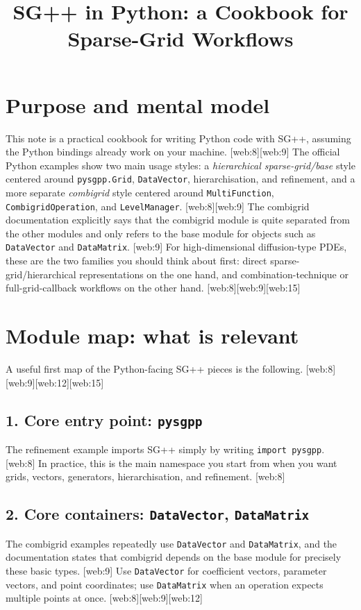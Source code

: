 \documentclass[11pt,a4paper]{article}
\title{SG++ in Python: a Cookbook for Sparse-Grid Workflows}
\author{}
\date{}
\begin{document}
\maketitle

\tableofcontents

\section{Purpose and mental model}

This note is a practical cookbook for writing Python code with SG++, assuming the Python bindings already work on your machine. [web:8][web:9]  
The official Python examples show two main usage styles: a \emph{hierarchical sparse-grid/base} style centered around \texttt{pysgpp.Grid}, \texttt{DataVector}, hierarchisation, and refinement, and a more separate \emph{combigrid} style centered around \texttt{MultiFunction}, \texttt{CombigridOperation}, and \texttt{LevelManager}. [web:8][web:9]  
The combigrid documentation explicitly says that the combigrid module is quite separated from the other modules and only refers to the base module for objects such as \texttt{DataVector} and \texttt{DataMatrix}. [web:9]  
For high-dimensional diffusion-type PDEs, these are the two families you should think about first: direct sparse-grid/hierarchical representations on the one hand, and combination-technique or full-grid-callback workflows on the other hand. [web:8][web:9][web:15]  

\section{Module map: what is relevant}

A useful first map of the Python-facing SG++ pieces is the following. [web:8][web:9][web:12][web:15]

\subsection*{1. Core entry point: \texttt{pysgpp}}
The refinement example imports SG++ simply by writing \texttt{import pysgpp}. [web:8]  
In practice, this is the main namespace you start from when you want grids, vectors, generators, hierarchisation, and refinement. [web:8]  

\subsection*{2. Core containers: \texttt{DataVector}, \texttt{DataMatrix}}
The combigrid examples repeatedly use \texttt{DataVector} and \texttt{DataMatrix}, and the documentation states that combigrid depends on the base module for precisely these basic types. [web:9]  
Use \texttt{DataVector} for coefficient vectors, parameter vectors, and point coordinates; use \texttt{DataMatrix} when an operation expects multiple points at once. [web:8][web:9][web:12]  
\end{document}
